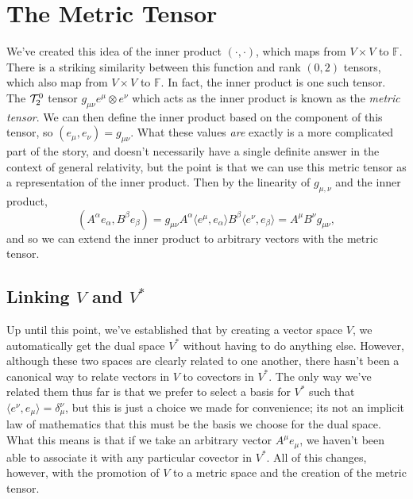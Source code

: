 \chapter{The Metric Tensor}
We've created this idea of the inner product $(\cdot,\cdot)$, which maps from $V \times V$ to $\mathbb{F}$.
There is a striking similarity between this function and rank $(0,2)$ tensors, which also map from $V \times V$ to $\mathbb{F}$.
In fact, the inner product is one such tensor.
The $\mathcal{T}^0_2$ tensor $g_{\mu\nu} e^\mu \otimes e^\nu$ which acts as the inner product is known as the \emph{metric tensor}.
We can then define the inner product based on the component of this tensor, so $(e_\mu,e_\nu) = g_{\mu\nu}$.
What these values \emph{are} exactly is a more complicated part of the story, and doesn't necessarily have a single definite answer in the context of general relativity, but the point is that we can use this metric tensor as a representation of the inner product.
Then by the linearity of $g_{\mu,\nu}$ and the inner product,
\[ (A^\alpha e_\alpha, B^\beta e_\beta) = g_{\mu\nu} A^\alpha \langle e^\mu, e_\alpha \rangle B^\beta \langle e^\nu, e_\beta \rangle = A^\mu B^\nu g_{\mu\nu}, \]
and so we can extend the inner product to arbitrary vectors with the metric tensor.

\section{Linking $V$ and $V^*$}
Up until this point, we've established that by creating a vector space $V$, we automatically get the dual space $V^*$ without having to do anything else.
However, although these two spaces are clearly related to one another, there hasn't been a canonical way to relate vectors in $V$ to covectors in $V^*$.
The only way we've related them thus far is that we prefer to select a basis for $V^*$ such that $\langle e^\nu, e_\mu \rangle = \delta_\mu^\nu$, but this is just a choice we made for convenience; its not an implicit law of mathematics that this must be the basis we choose for the dual space.
What this means is that if we take an arbitrary vector $A^\mu e_\mu$, we haven't been able to associate it with any particular covector in $V^*$.
All of this changes, however, with the promotion of $V$ to a metric space and the creation of the metric tensor.

